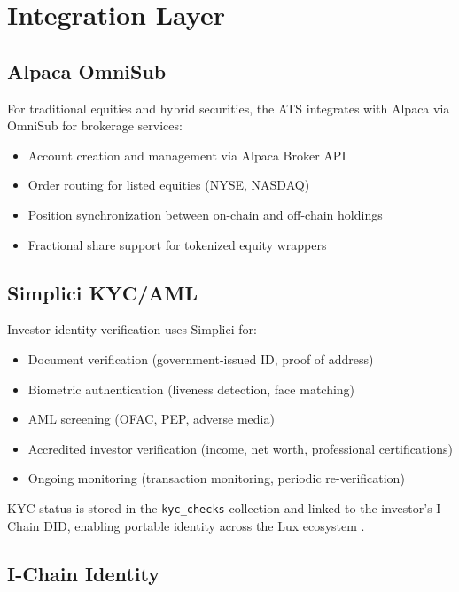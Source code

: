 \section{Integration Layer}
\label{sec:integration}

\subsection{Alpaca OmniSub}

For traditional equities and hybrid securities, the ATS integrates with Alpaca via OmniSub for brokerage services:

\begin{itemize}[nosep]
  \item Account creation and management via Alpaca Broker API
  \item Order routing for listed equities (NYSE, NASDAQ)
  \item Position synchronization between on-chain and off-chain holdings
  \item Fractional share support for tokenized equity wrappers
\end{itemize}

\subsection{Simplici KYC/AML}

Investor identity verification uses Simplici for:

\begin{itemize}[nosep]
  \item Document verification (government-issued ID, proof of address)
  \item Biometric authentication (liveness detection, face matching)
  \item AML screening (OFAC, PEP, adverse media)
  \item Accredited investor verification (income, net worth, professional certifications)
  \item Ongoing monitoring (transaction monitoring, periodic re-verification)
\end{itemize}

KYC status is stored in the \texttt{kyc\_checks} collection and linked to the investor's I-Chain DID, enabling portable identity across the Lux ecosystem \cite{lux-transfer-agent}.

\subsection{I-Chain Identity}

